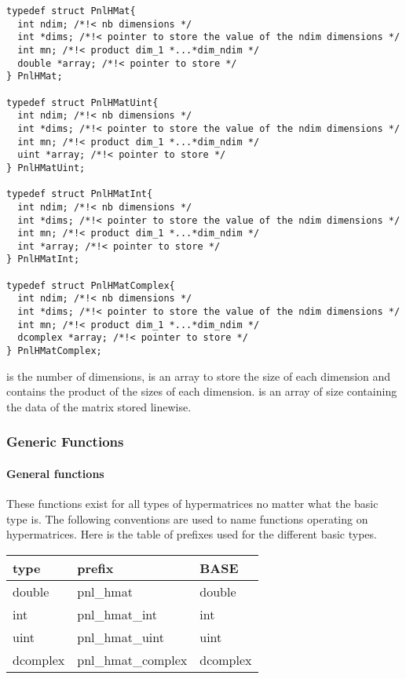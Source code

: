 \begin{verbatim}
typedef struct PnlHMat{
  int ndim; /*!< nb dimensions */ 
  int *dims; /*!< pointer to store the value of the ndim dimensions */ 
  int mn; /*!< product dim_1 *...*dim_ndim */
  double *array; /*!< pointer to store */
} PnlHMat;

typedef struct PnlHMatUint{
  int ndim; /*!< nb dimensions */ 
  int *dims; /*!< pointer to store the value of the ndim dimensions */ 
  int mn; /*!< product dim_1 *...*dim_ndim */
  uint *array; /*!< pointer to store */
} PnlHMatUint;

typedef struct PnlHMatInt{
  int ndim; /*!< nb dimensions */ 
  int *dims; /*!< pointer to store the value of the ndim dimensions */ 
  int mn; /*!< product dim_1 *...*dim_ndim */
  int *array; /*!< pointer to store */
} PnlHMatInt;

typedef struct PnlHMatComplex{
  int ndim; /*!< nb dimensions */ 
  int *dims; /*!< pointer to store the value of the ndim dimensions */ 
  int mn; /*!< product dim_1 *...*dim_ndim */
  dcomplex *array; /*!< pointer to store */
} PnlHMatComplex;
\end{verbatim}
 is the number of dimensions,  is an array to store the
size of each dimension and  contains the product of the sizes of each
dimension.  is an array of size  containing the data of the
matrix stored linewise.


\subsubsection{Generic Functions}
\paragraph{General functions}
These functions exist for all types of hypermatrices no matter what the basic type
is. The following conventions are used to name functions operating on hypermatrices.
Here is the table of prefixes used for the different basic types.

\begin{center}
  \begin{tabular}[t]{lll}
    type & prefix & BASE\\
    \hline
    double & pnl_hmat & double \\
    \hline
    int & pnl_hmat_int & int \\
    \hline
    uint & pnl_hmat_uint & uint\\
    \hline
    dcomplex & pnl_hmat_complex & dcomplex
  \end{tabular}
\end{center}

